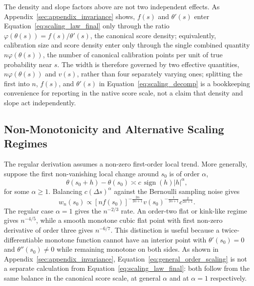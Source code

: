 \documentclass[11pt]{article}
\begin{document}
	The density and slope factors above are not two independent effects. As Appendix~\ref{sec:appendix_invariance} shows, $f(s)$ and $\theta'(s)$ enter Equation~\ref{eq:scaling_law_final} only through the ratio $\varphi(\theta(s))=f(s)/\theta'(s)$, the canonical score density; equivalently, calibration size and score density enter only through the single combined quantity $n\varphi(\theta(s))$, the number of canonical calibration points per unit of true probability near $s$. The width is therefore governed by two effective quantities, $n\varphi(\theta(s))$ and $v(s)$, rather than four separately varying ones; splitting the first into $n$, $f(s)$, and $\theta'(s)$ in Equation~\ref{eq:scaling_decomp} is a bookkeeping convenience for reporting in the native score scale, not a claim that density and slope act independently.
	
	\subsection{Non-Monotonicity and Alternative Scaling Regimes}
	\label{subsec:non_monotonic_theory}
	
	The regular derivation assumes a non-zero first-order local trend. More generally, suppose the first non-vanishing local change around $s_0$ is of order $\alpha$,
	\begin{equation}
		\theta(s_0+h)-\theta(s_0)
		\asymp
		c\,\operatorname{sign}(h)|h|^{\alpha},
	\end{equation}
	for some $\alpha\ge1$. Balancing $c(\Delta s)^\alpha$ against the Bernoulli sampling noise gives
	\begin{equation}
		w_n(s_0)
		\propto
		[nf(s_0)]^{-\frac{2\alpha}{2\alpha+1}}
		v(s_0)^{-\frac{1}{2\alpha+1}}
		c^{\frac{2}{2\alpha+1}}.
		\label{eq:general_order_scaling}
	\end{equation}
	The regular case $\alpha=1$ gives the $n^{-2/3}$ rate. An order-two flat or kink-like regime gives $n^{-4/5}$, while a smooth monotone cubic flat point with first non-zero derivative of order three gives $n^{-6/7}$. This distinction is useful because a twice-differentiable monotone function cannot have an interior point with $\theta'(s_0)=0$ and $\theta''(s_0)\ne0$ while remaining monotone on both sides. As shown in Appendix~\ref{sec:appendix_invariance}, Equation~\ref{eq:general_order_scaling} is not a separate calculation from Equation~\ref{eq:scaling_law_final}: both follow from the same balance in the canonical score scale, at general $\alpha$ and at $\alpha=1$ respectively.
	
\end{document}
